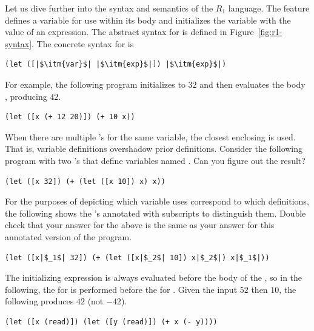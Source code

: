 \documentclass[11pt]{book}
\begin{document}
Let us dive further into the syntax and semantics of the $R_1$
language.  The  feature defines a variable for use within its
body and initializes the variable with the value of an expression.
The abstract syntax for  is defined in Figure~\ref{fig:r1-syntax}.
The concrete syntax for  is
\begin{lstlisting}
(let ([|$\itm{var}$| |$\itm{exp}$|]) |$\itm{exp}$|)
\end{lstlisting}
For example, the following program initializes  to $32$ and then
evaluates the body , producing $42$.
\begin{lstlisting}
(let ([x (+ 12 20)]) (+ 10 x))
\end{lstlisting}
When there are multiple 's for the same variable, the closest
enclosing  is used. That is, variable definitions overshadow
prior definitions. Consider the following program with two 's
that define variables named . Can you figure out the result?
\begin{lstlisting}
(let ([x 32]) (+ (let ([x 10]) x) x))
\end{lstlisting}
For the purposes of depicting which variable uses correspond to which
definitions, the following shows the 's annotated with
subscripts to distinguish them. Double check that your answer for the
above is the same as your answer for this annotated version of the
program.
\begin{lstlisting}
(let ([x|$_1$| 32]) (+ (let ([x|$_2$| 10]) x|$_2$|) x|$_1$|))
\end{lstlisting}
The initializing expression is always evaluated before the body of the
, so in the following, the  for  is
performed before the  for . Given the input
$52$ then $10$, the following produces $42$ (not $-42$).
\begin{lstlisting}
(let ([x (read)]) (let ([y (read)]) (+ x (- y))))
\end{lstlisting}
\end{document}
